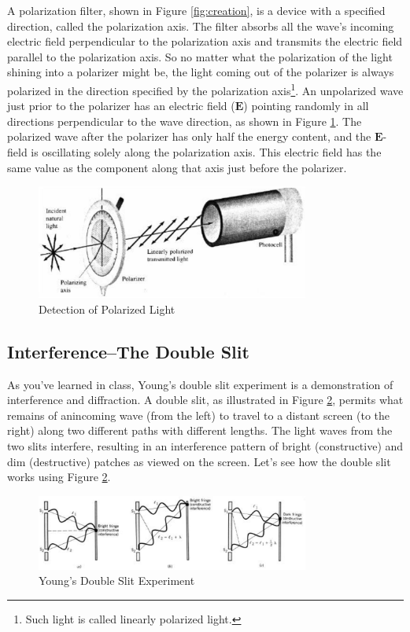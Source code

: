 A polarization filter, shown in Figure {\ref{fig:creation}}, is a device with a specified direction, called the polarization axis. The filter absorbs all the wave's incoming electric field perpendicular to the polarization axis and transmits the electric field parallel to the polarization axis. So no matter what the polarization of the light shining into a polarizer might be, the light coming out of the polarizer is always polarized in the direction specified by the polarization axis\footnote{Such light is called linearly polarized light.}. An unpolarized wave just prior to the polarizer has an electric field ($\mathbf{E}$) pointing randomly in all directions perpendicular to the wave direction, as shown in Figure {\ref{fig:detection}}. The polarized wave after the polarizer has only half the energy content, and the $\mathbf{E}$-field is oscillating solely along the polarization axis. This electric field has the same value as the component along that axis just before the polarizer.
\begin{figure}[h]
\centering
\includegraphics[width=0.8\textwidth]{./Exp8/pic/image2.png}
\caption{Detection of Polarized Light}
\label{fig:detection}
\end{figure} 

\subsection{Interference--The Double Slit}
As you've learned in class, Young's double slit experiment is a demonstration of interference and diffraction. A double slit, as illustrated in Figure {\ref{fig:double}}, permits what remains of anincoming wave (from the left) to travel to a distant screen (to the right) along two different paths with different lengths. The light waves from the two slits interfere, resulting in an interference pattern of bright (constructive) and dim (destructive) patches as viewed on the screen. Let's see how the double slit works using Figure {\ref{fig:double}}.
\begin{figure}[h]
\centering
\includegraphics[width=0.8\textwidth]{./Exp8/pic/image3.png}
\caption{Young's Double Slit Experiment}
\label{fig:double}
\end{figure} 

